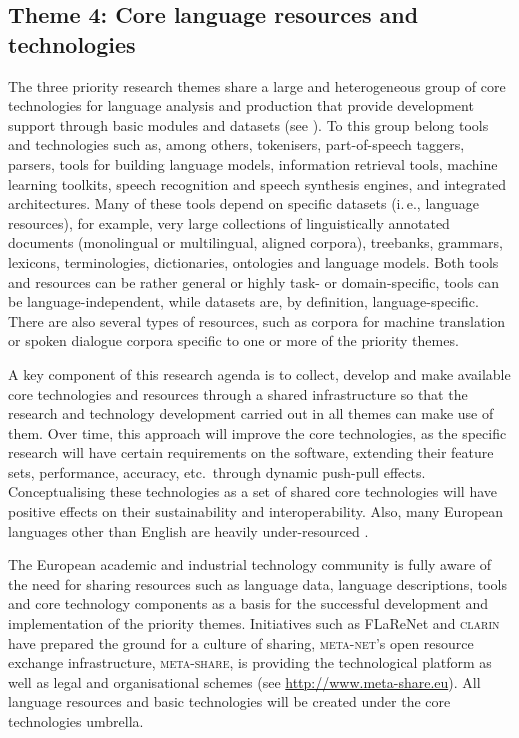 \documentclass[output=paper]{LSP/langsci}
\begin{document}
\subsection{Theme 4: Core language resources and technologies}
\label{sec:sharing-resources-and-results}

The three priority research themes share a large and heterogeneous
group of core technologies for language analysis and production that
provide development support through basic modules and datasets (see
). To this group belong tools and
technologies such as, among others, tokenisers, part-of-speech
taggers, parsers, tools for building language models, information
retrieval tools, machine learning toolkits, speech recognition and
speech synthesis engines, and integrated architectures. Many of these
tools depend on specific datasets (i.\,e., language resources), for
example, very large collections of linguistically annotated documents
(monolingual or multilingual, aligned corpora), treebanks, grammars,
lexicons, terminologies, dictionaries, ontologies and
language models. Both tools and resources can be rather general or
highly task- or domain-specific, tools can be language-independent,
while datasets are, by definition, language-specific. There are also several
types of resources, such as corpora for machine translation or spoken
dialogue corpora specific to one or more of the priority themes.

A key component of this research agenda is to collect, develop and
make available core technologies and resources through a shared
infrastructure so that the research and technology development carried
out in all themes can make use of them. Over time, this approach will
improve the core technologies, as the specific research will have
certain requirements on the software, extending their feature sets,
performance, accuracy, etc.~through dynamic push-pull
effects. Conceptualising these technologies as a set of shared core
technologies will have positive effects on their sustainability and
interoperability. Also, many European languages other than English are
heavily under-resourced \citep{LWP2012}.

The European academic and industrial technology community is fully
aware of the need for sharing resources such as language data,
language descriptions, tools and core technology components as a basis
for the successful development and implementation of the priority
themes. Initiatives such as FLaReNet \citep{flarenetsra2011} and
\textsc{clarin} have prepared the ground for a culture of sharing, \textsc{meta-net}'s
open resource exchange infrastructure, \textsc{meta-share}, is providing the
technological platform as well as legal and organisational schemes
(see \url{http://www.meta-share.eu}). All language resources and basic
technologies will be created under the core technologies umbrella.
\end{document}
